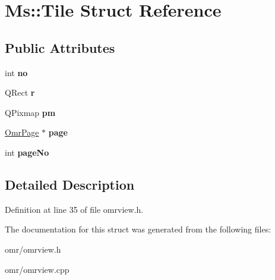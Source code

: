 \hypertarget{struct_ms_1_1_tile}{}\section{Ms\+:\+:Tile Struct Reference}
\label{struct_ms_1_1_tile}
\subsection*{Public Attributes}
\begin{DoxyCompactItemize}
\item 
\mbox{\label{struct_ms_1_1_tile_a99c1d9f81e3b0c33cc58d43237e67c79}} 
int {\bfseries no}
\item 
\mbox{\label{struct_ms_1_1_tile_aa2c890595bdf4d91a74387ff3853be52}} 
Q\+Rect {\bfseries r}
\item 
\mbox{\label{struct_ms_1_1_tile_a6829fc0a50e262f6c4dd02ecaec72ee5}} 
Q\+Pixmap {\bfseries pm}
\item 
\mbox{\label{struct_ms_1_1_tile_ad2ff13f87fe81c4587f5f342e876a639}} 
\hyperlink{class_ms_1_1_omr_page}{Omr\+Page} $\ast$ {\bfseries page}
\item 
\mbox{\label{struct_ms_1_1_tile_a43945b87da4cb0c210b3c44762757cf3}} 
int {\bfseries page\+No}
\end{DoxyCompactItemize}


\subsection{Detailed Description}


Definition at line 35 of file omrview.\+h.



The documentation for this struct was generated from the following files\+:\begin{DoxyCompactItemize}
\item 
omr/omrview.\+h\item 
omr/omrview.\+cpp\end{DoxyCompactItemize}
